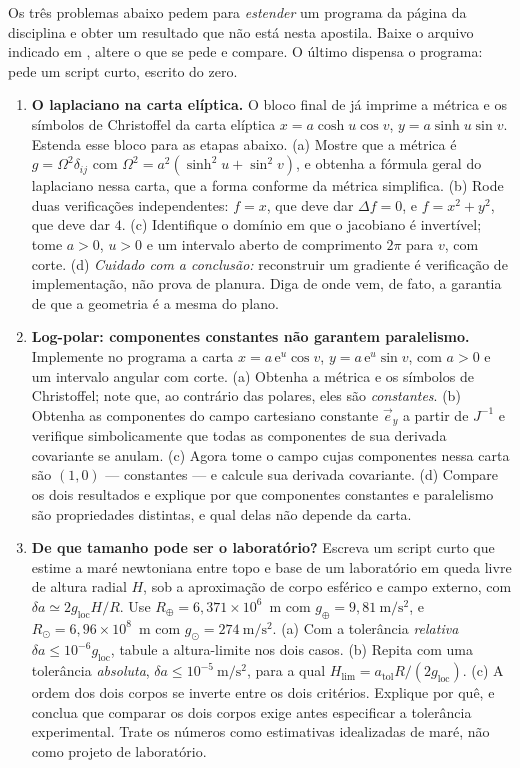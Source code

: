 \documentclass[12pt,a4paper,oneside]{book}
\theoremstyle{rgplain}
\theoremstyle{rgremark}
\begin{document}
Os três problemas abaixo pedem para \emph{estender} um programa da página da disciplina e obter um resultado que não está nesta apostila. Baixe o arquivo indicado em \href{\rgsitecodigos}{\texttt{\rgsitecodigos}}, altere o que se pede e compare. O último dispensa o programa: pede um script curto, escrito do zero.

\begin{enumerate}
  \item \textbf{O laplaciano na carta elíptica.} O bloco final de
 já imprime a métrica e os símbolos de
Christoffel da carta elíptica $x=a\cosh u\cos v$, $y=a\sinh u\sin v$. Estenda
esse bloco para as etapas abaixo. (a) Mostre que a métrica é $g=\Omega^2\delta_{ij}$ com
$\Omega^2=a^2(\sinh^2u+\sin^2v)$, e obtenha a fórmula geral do laplaciano nessa
carta, que a forma conforme da métrica simplifica. (b) Rode duas verificações
independentes: $f=x$, que deve dar $\Delta f=0$, e $f=x^2+y^2$, que deve dar
$4$. (c) Identifique o domínio em que o jacobiano é invertível; tome $a>0$,
$u>0$ e um intervalo aberto de comprimento $2\pi$ para $v$, com corte.
(d) \emph{Cuidado com a conclusão:} reconstruir um gradiente é verificação de
implementação, não prova de planura. Diga de onde vem, de fato, a garantia de
que a geometria é a mesma do plano.

  \item \textbf{Log-polar: componentes constantes não garantem paralelismo.}
Implemente no programa a carta $x=a\,\mathrm{e}^{u}\cos v$,
$y=a\,\mathrm{e}^{u}\sin v$, com $a>0$ e um intervalo angular com corte.
(a) Obtenha a métrica e os símbolos de Christoffel; note que, ao contrário das
polares, eles são \emph{constantes}. (b) Obtenha as componentes do campo
cartesiano constante $\vec e_y$ a partir de $J^{-1}$ e verifique
simbolicamente que todas as componentes de sua derivada covariante se anulam.
(c) Agora tome o campo cujas componentes nessa carta são $(1,0)$ --- constantes
--- e calcule sua derivada covariante. (d) Compare os dois resultados e explique
por que componentes constantes e paralelismo são propriedades distintas, e
qual delas não depende da carta.

  \item \textbf{De que tamanho pode ser o laboratório?} Escreva um script curto
que estime a maré newtoniana entre topo e base de um laboratório em queda
livre de altura radial $H$, sob a aproximação de corpo esférico e campo
externo, com $\delta a\simeq 2g_{\text{loc}}H/R$. Use
$R_\oplus=6{,}371\times10^{6}$~m com $g_\oplus=9{,}81~\mathrm{m/s^2}$, e
$R_\odot=6{,}96\times10^{8}$~m com $g_\odot=274~\mathrm{m/s^2}$.
(a) Com a tolerância \emph{relativa} $\delta a\le10^{-6}g_{\text{loc}}$, tabule
a altura-limite nos dois casos. (b) Repita com uma tolerância \emph{absoluta},
$\delta a\le10^{-5}~\mathrm{m/s^2}$, para a qual
$H_{\lim}=a_{\text{tol}}R/(2g_{\text{loc}})$. (c) A ordem dos dois corpos se
inverte entre os dois critérios. Explique por quê, e conclua que comparar os dois
corpos exige antes especificar a tolerância experimental. Trate os números como estimativas
idealizadas de maré, não como projeto de laboratório.
\end{enumerate}
\end{document}
